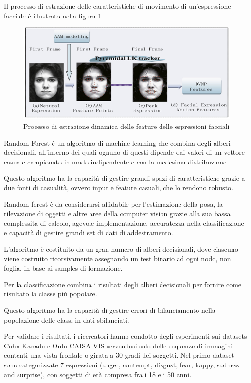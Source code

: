 Il processo di estrazione delle caratteristiche di movimento di un’espressione facciale è illustrato nella figura \ref{fig:image1}.
\begin{figure}
    \begin{center}    
        \includegraphics[width=1\linewidth]{images/14.png}
        \caption{Processo di estrazione dinamica delle feature delle espressioni facciali}
        \label{fig:image1}
    \end{center}
\end{figure}

Random Forest è un algoritmo di machine learning che combina degli alberi decisionali, all’interno dei quali ognuno di questi dipende dai valori di un vettore casuale campionato in modo indipendente e con la medesima distribuzione.

Questo algoritmo ha la capacità di gestire grandi spazi di caratteristiche grazie a due fonti di casualità, ovvero input e feature casuali, che lo rendono robusto. 

Random forest è da considerarsi affidabile per l'estimazione della posa, la rilevazione di oggetti e altre aree della computer vision grazie alla sua bassa complessità di calcolo, agevole implementazione, accuratezza nella classificazione e capacità di gestire grandi set di dati di addestramento. 

L’algoritmo è costituito da un gran numero di alberi decisionali, dove ciascuno viene costruito ricorsivamente assegnando un test binario ad ogni nodo, non foglia, in base ai samples di formazione. 

Per la classificazione combina i risultati degli alberi decisionali per fornire come risultato la classe più popolare. 

Questo algoritmo ha la capacità di gestire errori di bilanciamento nella popolazione delle classi in dati sbilanciati.

Per validare i risultati, i ricercatori hanno condotto degli esperimenti sui datasets Cohn-Kanade \cite{CohnKanadeDatabase} e Oulu-CAISA VIS \cite{OuluCasia} servendosi solo delle sequenze di immagini contenti una vista frontale o girata a 30 gradi dei soggetti.
Nel primo dataset sono categorizzate 7 espressioni (anger, contempt, disgust, fear, happy, sadness and surprise), con soggetti di età compresa fra i 18 e i 50 anni.

